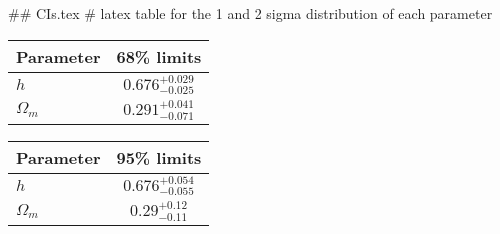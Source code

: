 ## CIs.tex
# latex table for the 1 and 2 sigma distribution of each parameter

\begin{tabular} { l  c}
 Parameter &  68\% limits\\
\hline
{\boldmath$h              $} & $0.676^{+0.029}_{-0.025}   $\\
{\boldmath$\Omega_m       $} & $0.291^{+0.041}_{-0.071}   $\\
\hline
\end{tabular}

\begin{tabular} { l  c}
 Parameter &  95\% limits\\
\hline
{\boldmath$h              $} & $0.676^{+0.054}_{-0.055}   $\\
{\boldmath$\Omega_m       $} & $0.29^{+0.12}_{-0.11}      $\\
\hline
\end{tabular}
